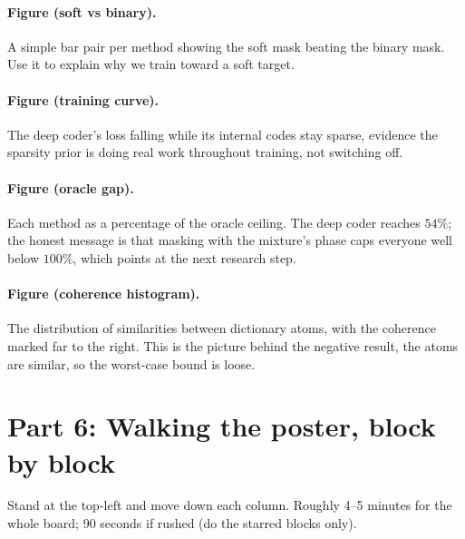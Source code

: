 \documentclass[11pt]{article}
\begin{document}
\paragraph{Figure (soft vs binary).} A simple bar pair per method showing the soft
mask beating the binary mask. Use it to explain why we train toward a soft target.

\paragraph{Figure (training curve).} The deep coder's loss falling while its
internal codes stay sparse, evidence the sparsity prior is doing real work
throughout training, not switching off.

\paragraph{Figure (oracle gap).} Each method as a percentage of the oracle ceiling.
The deep coder reaches $54\%$; the honest message is that masking with the mixture's
phase caps everyone well below $100\%$, which points at the next research step.

\paragraph{Figure (coherence histogram).} The distribution of similarities between
dictionary atoms, with the coherence marked far to the right. This is the picture
behind the negative result, the atoms are similar, so the worst-case bound is loose.

\section{Part 6: Walking the poster, block by block}

Stand at the top-left and move down each column. Roughly 4--5 minutes for the whole
board; 90 seconds if rushed (do the starred blocks only).
\end{document}

